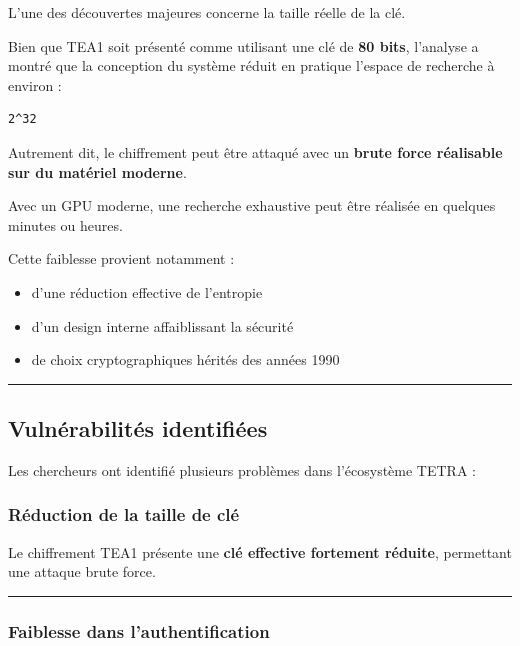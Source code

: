 \documentclass[
  french,
]{article}
\providecommand{\tightlist}{%
  \setlength{\itemsep}{0pt}\setlength{\parskip}{0pt}}
\begin{document}
L'une des découvertes majeures concerne la taille réelle de la clé.

Bien que TEA1 soit présenté comme utilisant une clé de \textbf{80 bits},
l'analyse a montré que la conception du système réduit en pratique
l'espace de recherche à environ :

\begin{verbatim}
2^32
\end{verbatim}

Autrement dit, le chiffrement peut être attaqué avec un \textbf{brute
force réalisable sur du matériel moderne}.

Avec un GPU moderne, une recherche exhaustive peut être réalisée en
quelques minutes ou heures.

Cette faiblesse provient notamment :

\begin{itemize}
\tightlist
\item
  d'une réduction effective de l'entropie
\item
  d'un design interne affaiblissant la sécurité
\item
  de choix cryptographiques hérités des années 1990
\end{itemize}

\begin{center}\rule{0.5\linewidth}{0.5pt}\end{center}

\subsection{Vulnérabilités
identifiées}\label{vulnuxe9rabilituxe9s-identifiuxe9es}

Les chercheurs ont identifié plusieurs problèmes dans l'écosystème TETRA
:

\subsubsection{Réduction de la taille de
clé}\label{ruxe9duction-de-la-taille-de-cluxe9}

Le chiffrement TEA1 présente une \textbf{clé effective fortement
réduite}, permettant une attaque brute force.

\begin{center}\rule{0.5\linewidth}{0.5pt}\end{center}

\subsubsection{Faiblesse dans
l'authentification}\label{faiblesse-dans-lauthentification}
\end{document}
